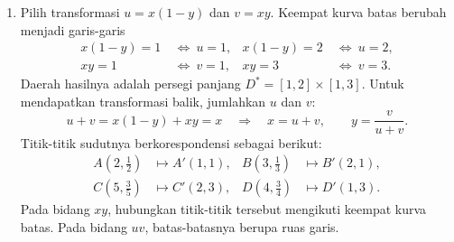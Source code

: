 \documentclass[11pt,a4paper]{article}
\begin{document}
\begin{enumerate}[itemsep=12pt,parsep=5pt]
  \item Pilih transformasi $u=x(1-y)$ dan $v=xy$.
        Keempat kurva batas berubah menjadi garis-garis
        \[
          \begin{aligned}
            x(1-y)=1 & \ \Longleftrightarrow\ u=1, &
            x(1-y)=2 & \ \Longleftrightarrow\ u=2,   \\
            xy=1     & \ \Longleftrightarrow\ v=1, &
            xy=3     & \ \Longleftrightarrow\ v=3.
          \end{aligned}
        \]
        Daerah hasilnya adalah persegi panjang $D^*=[1,2]\times[1,3]$.
        Untuk mendapatkan transformasi balik, jumlahkan $u$ dan $v$:
        \[
          u+v=x(1-y)+xy=x
          \quad\Longrightarrow\quad
          x=u+v,\qquad y=\frac{v}{u+v}.
        \]
        Titik-titik sudutnya berkorespondensi sebagai berikut:
        \[
          \begin{aligned}
            A(2,\tfrac12) & \mapsto A'(1,1), & B(3,\tfrac13) & \mapsto B'(2,1), \\
            C(5,\tfrac35) & \mapsto C'(2,3), & D(4,\tfrac34) & \mapsto D'(1,3).
          \end{aligned}
        \]
        Pada bidang $xy$, hubungkan titik-titik tersebut mengikuti keempat kurva batas.
        Pada bidang $uv$, batas-batasnya berupa ruas garis.


\end{enumerate}
\end{document}
